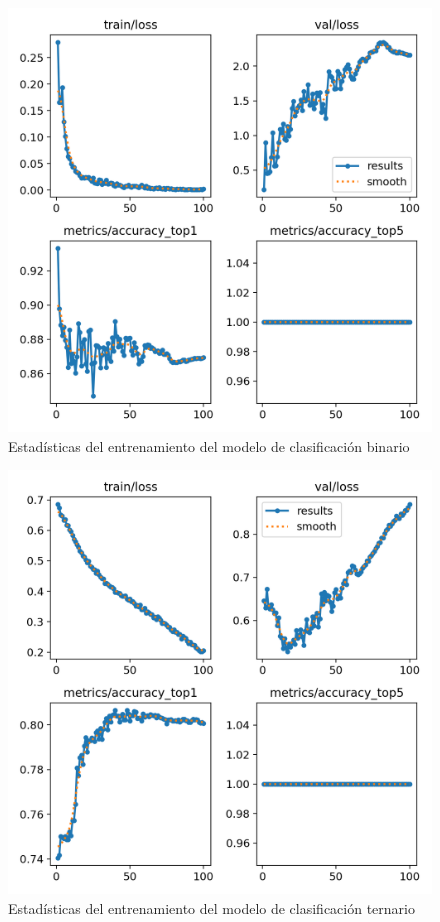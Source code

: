 \documentclass[12pt]{report} %
\begin{document}
 \begin{minipage}{0.45\textwidth}
    \begin{figure}[H]
    \includegraphics[width=\textwidth]{results2.png}
    \caption  {\small{Estadísticas del entrenamiento del modelo de clasificación binario}}
    \end{figure}
\end{minipage}
\hspace{0.5cm}
\begin{minipage}{0.45\textwidth}
    \begin{figure}[H]
    \includegraphics[width=\textwidth]{results3.png}
    \caption  {\small{Estadísticas del entrenamiento del modelo de clasificación ternario}}
    \end{figure}
\end{minipage}
   
\end{document}
